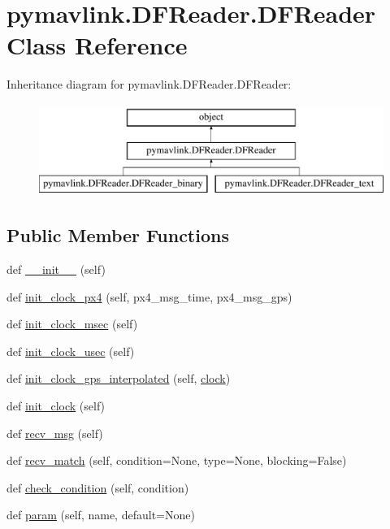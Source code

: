 \hypertarget{classpymavlink_1_1DFReader_1_1DFReader}{}\section{pymavlink.\+D\+F\+Reader.\+D\+F\+Reader Class Reference}
\label{classpymavlink_1_1DFReader_1_1DFReader}
Inheritance diagram for pymavlink.\+D\+F\+Reader.\+D\+F\+Reader\+:\begin{figure}[H]
\begin{center}
\leavevmode
\includegraphics[height=3.000000cm]{classpymavlink_1_1DFReader_1_1DFReader}
\end{center}
\end{figure}
\subsection*{Public Member Functions}
\begin{DoxyCompactItemize}
\item 
def \mbox{\hyperlink{classpymavlink_1_1DFReader_1_1DFReader_a61e0dac0ea04b561026a7430a4151e4d}{\+\_\+\+\_\+init\+\_\+\+\_\+}} (self)
\item 
def \mbox{\hyperlink{classpymavlink_1_1DFReader_1_1DFReader_a5c00e009f191c36057548ab1ec7c55c6}{init\+\_\+clock\+\_\+px4}} (self, px4\+\_\+msg\+\_\+time, px4\+\_\+msg\+\_\+gps)
\item 
def \mbox{\hyperlink{classpymavlink_1_1DFReader_1_1DFReader_a7024dae05e22c20921859c26202e4c2c}{init\+\_\+clock\+\_\+msec}} (self)
\item 
def \mbox{\hyperlink{classpymavlink_1_1DFReader_1_1DFReader_ab8d8991c0b0a08c78280a368c79fbd1c}{init\+\_\+clock\+\_\+usec}} (self)
\item 
def \mbox{\hyperlink{classpymavlink_1_1DFReader_1_1DFReader_afb024cca6810c36c6cb2164c35e25ef7}{init\+\_\+clock\+\_\+gps\+\_\+interpolated}} (self, \mbox{\hyperlink{classpymavlink_1_1DFReader_1_1DFReader_acd84fa97df078e2f2bc16e06904f73a0}{clock}})
\item 
def \mbox{\hyperlink{classpymavlink_1_1DFReader_1_1DFReader_ac2bc47ae655fa152f8e434470731cbda}{init\+\_\+clock}} (self)
\item 
def \mbox{\hyperlink{classpymavlink_1_1DFReader_1_1DFReader_a7c726e75615d8cc5b2a65fe62ab2f21d}{recv\+\_\+msg}} (self)
\item 
def \mbox{\hyperlink{classpymavlink_1_1DFReader_1_1DFReader_aa0900449adff0ff0946cc568f83308ed}{recv\+\_\+match}} (self, condition=None, type=None, blocking=False)
\item 
def \mbox{\hyperlink{classpymavlink_1_1DFReader_1_1DFReader_a793c18e4b164a17f7088a0cec9a647d5}{check\+\_\+condition}} (self, condition)
\item 
def \mbox{\hyperlink{classpymavlink_1_1DFReader_1_1DFReader_a610321cdac70a9229612b42efc1f1dd0}{param}} (self, name, default=None)
\end{DoxyCompactItemize}
